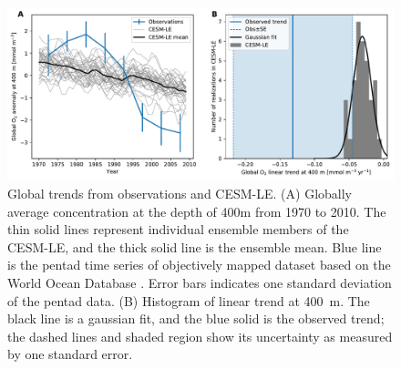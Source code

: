 \documentclass[draft,linenumbers]{report_chapter}
\begin{document}
\begin{figure}[tbp]
\centering
\includegraphics[width=1\textwidth]{obs-cesm-global-trends.pdf}
\caption{Global  trends from observations and CESM-LE.
(A) Globally average  concentration at the depth of 400m from 1970 to 2010.
The thin solid lines represent individual ensemble members of the CESM-LE, and the thick solid line is the ensemble mean.
Blue line is the pentad time series of objectively mapped  dataset based on the World Ocean Database \citep{Ito-Minobe-etal-2017}.
Error bars indicates one standard deviation of the pentad data.
(B) Histogram of linear  trend at 400~m.
The black line is a gaussian fit, and the blue solid is the observed trend; the dashed lines and shaded region show its uncertainty as measured by one standard error. }
\label{fig:test_trend_global}
\end{figure}
\end{document}
